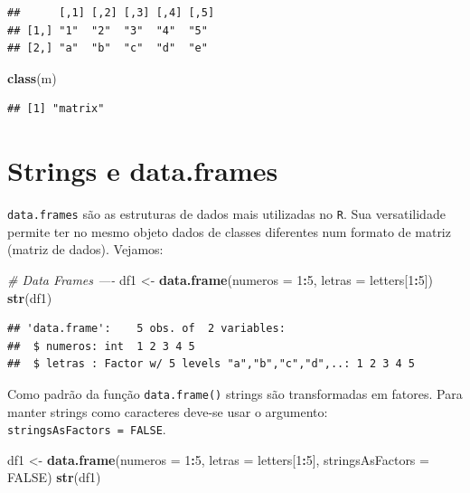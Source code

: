 \documentclass[]{book}
\newenvironment{Shaded}{\begin{snugshade}}{\end{snugshade}}
\newcommand{\CommentTok}[1]{\textcolor[rgb]{0.56,0.35,0.01}{\textit{#1}}}
\newcommand{\DataTypeTok}[1]{\textcolor[rgb]{0.13,0.29,0.53}{#1}}
\newcommand{\DecValTok}[1]{\textcolor[rgb]{0.00,0.00,0.81}{#1}}
\newcommand{\KeywordTok}[1]{\textcolor[rgb]{0.13,0.29,0.53}{\textbf{#1}}}
\newcommand{\NormalTok}[1]{#1}
\newcommand{\OperatorTok}[1]{\textcolor[rgb]{0.81,0.36,0.00}{\textbf{#1}}}
\newcommand{\OtherTok}[1]{\textcolor[rgb]{0.56,0.35,0.01}{#1}}
\newcommand{\StringTok}[1]{\textcolor[rgb]{0.31,0.60,0.02}{#1}}
\begin{document}
\begin{verbatim}
##      [,1] [,2] [,3] [,4] [,5]
## [1,] "1"  "2"  "3"  "4"  "5" 
## [2,] "a"  "b"  "c"  "d"  "e"
\end{verbatim}

\begin{Shaded}
\begin{Highlighting}[]
\KeywordTok{class}\NormalTok{(m)}
\end{Highlighting}
\end{Shaded}

\begin{verbatim}
## [1] "matrix"
\end{verbatim}

\hypertarget{strings-e-data.frames}{%
\section{Strings e data.frames}\label{strings-e-data.frames}}

\texttt{data.frames} são as estruturas de dados mais utilizadas no \texttt{R}. Sua versatilidade permite ter no mesmo objeto dados de classes diferentes num formato de matriz (matriz de dados). Vejamos:

\begin{Shaded}
\begin{Highlighting}[]
\CommentTok{# Data Frames  ----}
\NormalTok{df1 <-}\StringTok{ }\KeywordTok{data.frame}\NormalTok{(}\DataTypeTok{numeros =} \DecValTok{1}\OperatorTok{:}\DecValTok{5}\NormalTok{, }\DataTypeTok{letras =}\NormalTok{ letters[}\DecValTok{1}\OperatorTok{:}\DecValTok{5}\NormalTok{])}
\KeywordTok{str}\NormalTok{(df1)}
\end{Highlighting}
\end{Shaded}

\begin{verbatim}
## 'data.frame':	5 obs. of  2 variables:
##  $ numeros: int  1 2 3 4 5
##  $ letras : Factor w/ 5 levels "a","b","c","d",..: 1 2 3 4 5
\end{verbatim}

Como padrão da função \texttt{data.frame()} strings são transformadas em fatores. Para manter strings como caracteres deve-se usar o argumento: \texttt{stringsAsFactors\ =\ FALSE}.

\begin{Shaded}
\begin{Highlighting}[]
\NormalTok{df1 <-}\StringTok{ }\KeywordTok{data.frame}\NormalTok{(}\DataTypeTok{numeros =} \DecValTok{1}\OperatorTok{:}\DecValTok{5}\NormalTok{, }\DataTypeTok{letras =}\NormalTok{ letters[}\DecValTok{1}\OperatorTok{:}\DecValTok{5}\NormalTok{], }\DataTypeTok{stringsAsFactors =} \OtherTok{FALSE}\NormalTok{)}
\KeywordTok{str}\NormalTok{(df1)}
\end{Highlighting}
\end{Shaded}
\end{document}
